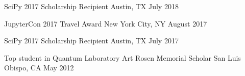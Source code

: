 
\begin{cvpoints}


  \cvpoint
    {SciPy 2017} %
    {Scholarship Recipient} %
    {Austin, TX} %
    {July 2018} %

  \cvpoint
    {JupyterCon 2017} %
    {Travel Award} %
    {New York City, NY} %
    {August 2017} %
    
  \cvpoint
    {SciPy 2017} %
    {Scholarship Recipient} %
    {Austin, TX} %
    {July 2017} %

  \cvpoint
    {Top student in Quantum Laboratory} %
    {Art Rosen Memorial Scholar} %
    {San Luis Obispo, CA} %
    {May 2012} %

\end{cvpoints}
